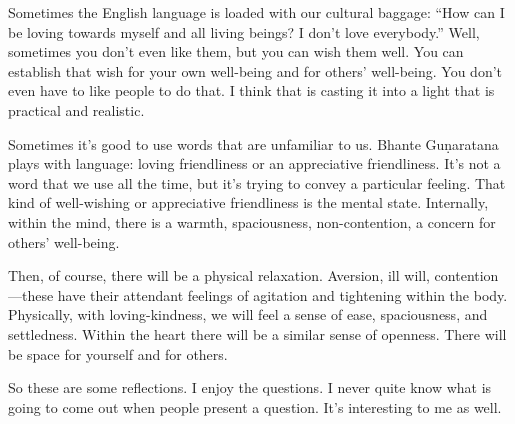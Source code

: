 Sometimes the English language is loaded with our cultural baggage: “How
can I be loving towards myself and all living beings? I don't love
everybody.” Well, sometimes you don’t even like them, but you can wish
them well. You can establish that wish for your own well-being and for
others’ well-being. You don’t even have to like people to do that. I
think that is casting it into a light that is practical and realistic.

Sometimes it’s good to use words that are unfamiliar to us. Bhante
Guṇaratana plays with language: loving friendliness or an appreciative
friendliness. It’s not a word that we use all the time, but it’s trying
to convey a particular feeling. That kind of well-wishing or
appreciative friendliness is the mental state. Internally, within the
mind, there is a warmth, spaciousness, non-contention, a concern for
others’ well-being.

Then, of course, there will be a physical relaxation. Aversion, ill
will, contention—these have their attendant feelings of agitation and
tightening within the body. Physically, with loving-kindness, we will
feel a sense of ease, spaciousness, and settledness. Within the heart
there will be a similar sense of openness. There will be space for
yourself and for others.

So these are some reflections. I enjoy the questions. I never quite know
what is going to come out when people present a question. It’s
interesting to me as well.
